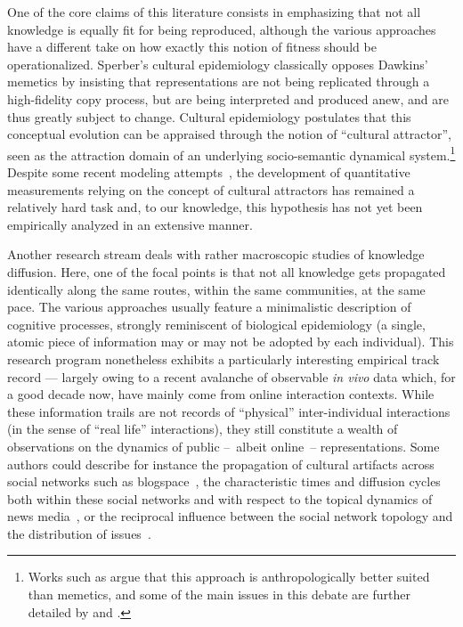 One of the core claims of this literature consists in emphasizing that not all knowledge is equally fit for being reproduced, although the various approaches have a different take on how exactly this notion of fitness should be operationalized. Sperber's cultural epidemiology classically opposes Dawkins' memetics by insisting that representations are not being replicated through a high-fidelity copy process, but are being interpreted and produced anew, and are thus greatly subject to change.
Cultural epidemiology postulates that this conceptual evolution can be appraised through the notion of ``cultural attractor'', seen as the attraction domain of an underlying socio-semantic dynamical system.\footnote{Works such as \citet{Atran03} argue that this approach is anthropologically better suited than memetics, and some of the main issues in this debate are further detailed by \citet{Kuper00} and \citet{Bloch00}.}
Despite some recent modeling attempts~\citep[e.g.][]{Claidiere07}, the development of quantitative measurements relying on the concept of cultural attractors has remained a relatively hard task and, to our knowledge, this hypothesis has not yet been empirically analyzed in an extensive manner.


Another research stream deals with rather macroscopic studies of knowledge diffusion. Here, one of the focal points is that not all knowledge gets propagated identically along the same routes, within the same communities, at the same pace. The various approaches usually feature a minimalistic description of cognitive processes, strongly reminiscent of biological epidemiology (a single, atomic piece of information may or may not be adopted by each individual).  
This research program nonetheless exhibits a particularly interesting empirical track record --- largely owing to a recent avalanche of observable \emph{in vivo} data which, for a good decade now, have mainly come from online interaction contexts.
While these information trails are not records of ``physical'' inter-individual interactions (in the sense of ``real life'' interactions), they still constitute a wealth of observations on the dynamics of public --~albeit online~-- representations.
Some authors could describe for instance the propagation of cultural artifacts across social networks such as blogspace~\citep{Gruhl04}, the characteristic times and diffusion cycles both within these social networks and with respect to the topical dynamics of news media~\citep{Leskovec09}, or the reciprocal influence between the social network topology and the distribution of issues~\citep{Cointet09}.

